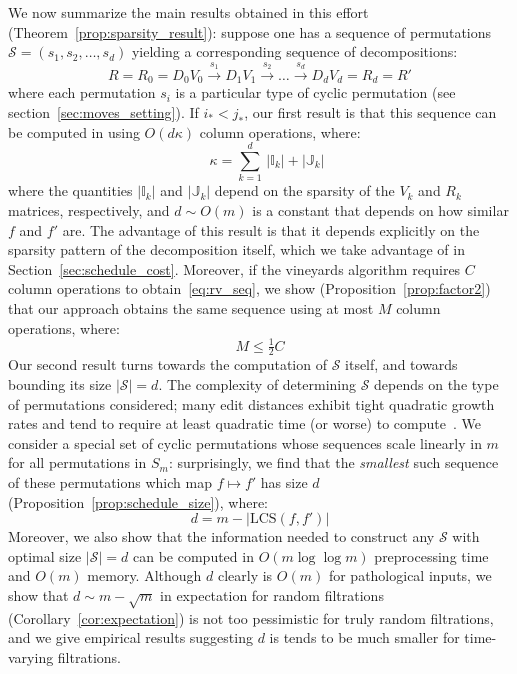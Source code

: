 \documentclass[sn-mathphys]{sn-jnl}
\begin{document}
We now summarize the main results obtained in this effort (Theorem~\ref{prop:sparsity_result}): suppose one has a sequence of permutations $\mathcal{S} = \left( s_1, s_2, \dots, s_d \right)$ yielding a corresponding sequence of decompositions:
  \begin{equation}\label{eq:rv_seq}
   	R = R_0 = D_0 V_0 \overset{s_1}{\to} D_1 V_{1} \overset{s_2}{\to} \dots \overset{s_d}{\to} D_d V_{d} = R_d = R'
 \end{equation}
 where each permutation $s_i$ is a particular type of cyclic permutation (see section~\ref{sec:moves_setting}). If $i_\ast < j_\ast$, our first result is that this sequence can be computed in using $O(d\kappa)$ column operations, where: 
\begin{equation}
	\quad \kappa = \sum\limits_{k = 1}^d \, \lvert \mathbb{I}_{k}\rvert + \lvert \mathbb{J}_{k}\rvert
\end{equation}
where the quantities $\lvert \mathbb{I}_{k} \rvert$ and $\lvert \mathbb{J}_{k} \rvert$ depend on the sparsity of the $V_k$ and $R_k$ matrices, respectively, and $d \sim O(m)$ is a constant that depends on how similar $f$ and $f'$ are. The advantage of this result is that it depends explicitly on the sparsity pattern of the decomposition itself, which we take advantage of in Section~\ref{sec:schedule_cost}. Moreover, if the vineyards algorithm requires $C$ column operations to obtain~\eqref{eq:rv_seq}, we show (Proposition~\ref{prop:factor2}) that our approach obtains the same sequence using at most $M$ column operations, where: 
\begin{equation}
	M \leq \tfrac{1}{2}  C
\end{equation}
Our second result turns towards the computation of $\mathcal{S}$ itself, and towards bounding its size $\lvert \mathcal{S} \rvert = d$. 
The complexity of determining $\mathcal{S}$ depends on the type of permutations considered; many edit distances exhibit tight quadratic growth rates and tend to require at least quadratic time (or worse) to compute~\cite{labarre2013lower}. 
We consider a special set of cyclic permutations whose sequences scale linearly in $m$ for all permutations in $S_m$: surprisingly, we find that the \emph{smallest} such sequence of these permutations which map $f \mapsto f'$ has size $d$ (Proposition~\ref{prop:schedule_size}), where: 
\begin{equation}
	d = m - \lvert \mathrm{LCS}(f, f') \rvert 
\end{equation}
Moreover, we also show that the information needed to construct any $\mathcal{S}$ with optimal size $\lvert \mathcal{S} \rvert = d$ can be computed in $O(m \log \log m)$ preprocessing time and $O(m)$ memory. Although $d$ clearly is $O(m)$ for pathological inputs, we show that $d \sim m - \sqrt{m}$ in expectation for random filtrations (Corollary~\ref{cor:expectation}) is not too pessimistic for truly random filtrations, and we give empirical results suggesting $d$ is tends to be much smaller for time-varying filtrations. 
\\
% 
\end{document}
